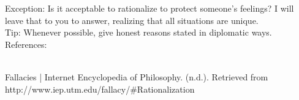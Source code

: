 \documentclass[a4paper,12pt,single,pdftex]{scrbook}
\begin{document}
    
      Exception: Is it acceptable to rationalize to protect someone’s feelings?  I will leave that to you to answer, realizing that all situations are unique.
    \\

    
      Tip: Whenever possible, give honest reasons stated in diplomatic ways.
    \\

    References:

    
      
        
      \\

      
        
          Fallacies | Internet Encyclopedia of Philosophy. (n.d.). Retrieved from http://www.iep.utm.edu/fallacy/\#Rationalization
        
      
    
\end{document}
